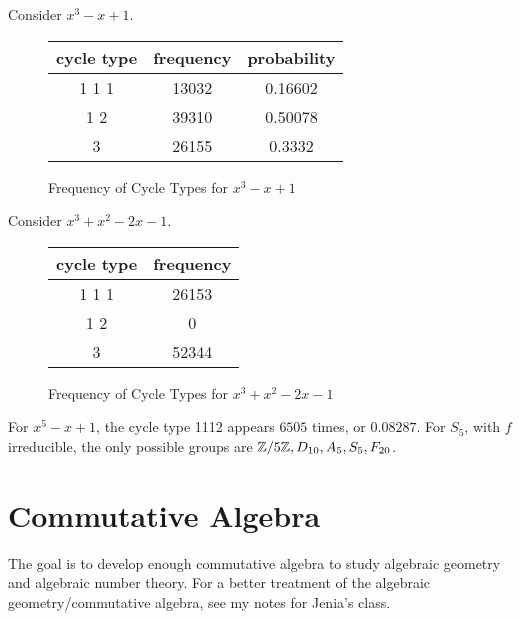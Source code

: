 \message{ !name(notes.tex)}\documentclass[10pt, twoside]{article}
\begin{document}
        \begin{exm}
            Consider $x^3-x+1$.
            \begin{figure}[H]
                \begin{center}
                    \begin{tabular}{ccc}
                        \toprule
                        cycle type & frequency & probability \\
                        \midrule
                        1 1 1 & 13032 & 0.16602 \\
                        1 2 & 39310 & 0.50078 \\
                        3 & 26155 & 0.3332 \\
                        \bottomrule
                    \end{tabular}
                \end{center}
                \caption{Frequency of Cycle Types for $x^3-x+1$}
            \end{figure}
        \end{exm}
        \begin{exm}
            Consider $x^3+x^2 -2x-1$.
            \begin{figure}[H]
                \begin{center}
                    \begin{tabular}{cc}
                        \toprule
                        cycle type & frequency  \\
                        \midrule
                        1 1 1 & 26153  \\
                        1 2 & 0  \\
                        3 & 52344  \\
                        \bottomrule
                    \end{tabular}
                \end{center}
                \caption{Frequency of Cycle Types for $x^3+x^2-2x-1$}
            \end{figure}
        \end{exm}

        \begin{exm}
            For $x^5-x+1$, the cycle type 1112 appears $6505$ times, or $0.08287$. For $S_5$, with $f$ irreducible, the only possible groups are $\mathbb{Z}/5\mathbb{Z}, D_{10}, A_5, S_5, F_{20}$.
        \end{exm}

        \section{Commutative Algebra}
        The goal is to develop enough commutative algebra to study algebraic geometry and algebraic number theory. For a better treatment of the algebraic geometry/commutative algebra, see my notes for Jenia's class.
\end{document}
